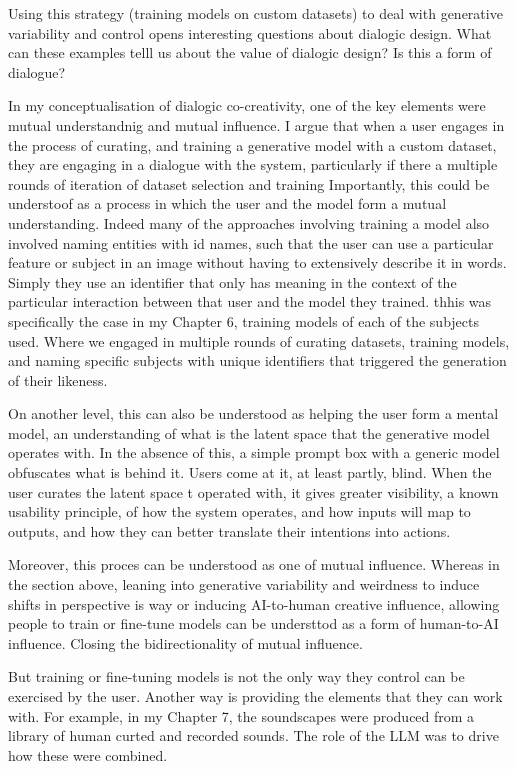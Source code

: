 Using this strategy (training models on custom datasets) to deal with generative variability and control opens interesting questions about dialogic design. What can these examples telll us about the value of dialogic design? Is this a form of dialogue?

In my conceptualisation of dialogic co-creativity, one of the key elements were mutual understandnig and mutual influence. I argue that when a user engages in the process of curating, and training a generative model with a custom dataset, they are engaging in a dialogue with the system, particularly if there a multiple rounds of iteration of dataset selection and training Importantly, this could be understoof as a process in which the user and the model form a mutual understanding. Indeed many of the approaches involving training a model also involved naming entities with id names, such that the user can use a particular feature or subject in an image without having to extensively describe it in words. Simply they use an identifier that only has meaning in the context of the particular interaction between that user and the model they trained. 
thhis was specifically the case in my Chapter 6, training models of each of the subjects used. Where we engaged in multiple rounds of curating datasets, training models, and naming specific subjects with unique identifiers that triggered the generation of their likeness. 

On another level, this can also be understood as helping the user form a mental model, an understanding of what is the latent space that the generative model operates with. In the absence of this, a simple prompt box with a generic model obfuscates what is behind it. Users come at it, at least partly, blind. When the user curates the latent space t operated with, it gives greater visibility, a known usability principle, of how  the system operates, and how inputs will map to outputs, and how they can better translate their intentions into actions. 

Moreover, this proces can be understood as one of mutual influence. Whereas in the section above, leaning into generative variability and weirdness to induce shifts in perspective is way or inducing AI-to-human creative influence, allowing people to train or fine-tune models can be understtod as a form of human-to-AI influence. Closing the bidirectionality of mutual influence. 

But training or fine-tuning models is not the only way they control can be exercised by the user. Another way is providing the elements that they can work with. For example, in my Chapter 7, the soundscapes were produced from a library of human curted and recorded sounds. The role of the LLM was to drive how these were combined. 

